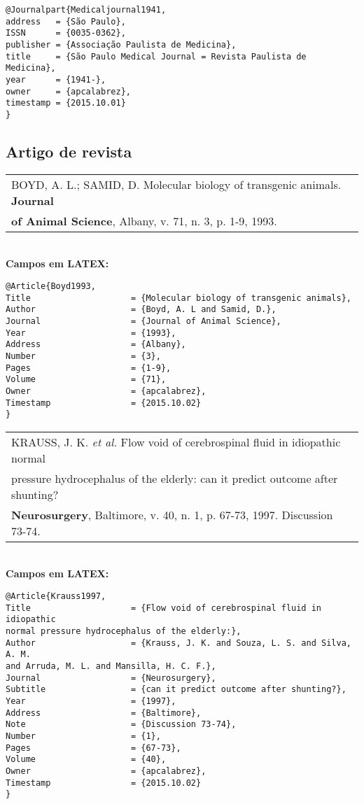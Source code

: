 \begin{verbatim}
@Journalpart{Medicaljournal1941,
address   = {São Paulo},
ISSN      = {0035-0362},
publisher = {Associação Paulista de Medicina},
title     = {São Paulo Medical Journal = Revista Paulista de Medicina},
year      = {1941-},
owner     = {apcalabrez},
timestamp = {2015.10.01}
}
\end{verbatim}


\subsection{Artigo de revista}


\begin{tabular}{|l|c|} \hline
	BOYD, A. L.; SAMID, D. Molecular biology of transgenic animals. \textbf{Journal } \\ \textbf{of  Animal Science}, Albany, v. 71, n. 3, p. 1-9, 1993.
	\\\hline
\end{tabular} \\

\textbf{Campos em LATEX:} 

\begin{verbatim}
@Article{Boyd1993,
Title                    = {Molecular biology of transgenic animals},
Author                   = {Boyd, A. L and Samid, D.},
Journal                  = {Journal of Animal Science},
Year                     = {1993},
Address                  = {Albany},
Number                   = {3},
Pages                    = {1-9},
Volume                   = {71},
Owner                    = {apcalabrez},
Timestamp                = {2015.10.02}
}
\end{verbatim}

\begin{tabular}{|l|c|} \hline
	KRAUSS, J. K. \textit{et al.} Flow void of cerebrospinal fluid in idiopathic normal\\
	pressure hydrocephalus of the elderly: can it predict outcome after
	shunting? \\\textbf{Neurosurgery}, Baltimore, v. 40, n. 1, p. 67-73, 1997.
	Discussion 73-74. 
	\\\hline
\end{tabular} \\

\textbf{Campos em LATEX:} 

\begin{verbatim}
@Article{Krauss1997,
Title                    = {Flow void of cerebrospinal fluid in idiopathic 
normal pressure hydrocephalus of the elderly:},
Author                   = {Krauss, J. K. and Souza, L. S. and Silva, A. M. 
and Arruda, M. L. and Mansilla, H. C. F.},
Journal                  = {Neurosurgery},
Subtitle                 = {can it predict outcome after shunting?},
Year                     = {1997},
Address                  = {Baltimore},
Note                     = {Discussion 73-74},
Number                   = {1},
Pages                    = {67-73},
Volume                   = {40},
Owner                    = {apcalabrez},
Timestamp                = {2015.10.02}
}
\end{verbatim}

